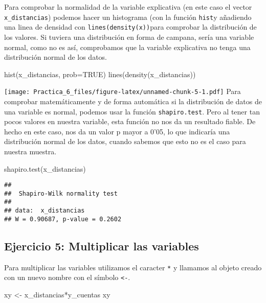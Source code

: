 \documentclass[
]{article}
\newenvironment{Shaded}{\begin{snugshade}}{\end{snugshade}}
\newcommand{\AttributeTok}[1]{\textcolor[rgb]{0.77,0.63,0.00}{#1}}
\newcommand{\ConstantTok}[1]{\textcolor[rgb]{0.00,0.00,0.00}{#1}}
\newcommand{\FunctionTok}[1]{\textcolor[rgb]{0.00,0.00,0.00}{#1}}
\newcommand{\NormalTok}[1]{#1}
\newcommand{\OtherTok}[1]{\textcolor[rgb]{0.56,0.35,0.01}{#1}}
\newcommand{\SpecialCharTok}[1]{\textcolor[rgb]{0.00,0.00,0.00}{#1}}
\begin{document}
Para comprobar la normalidad de la variable explicativa (en este caso el
vector \texttt{x\_distancias}) podemos hacer un histograma (con la
función \texttt{hist}y añadiendo una linea de densidad con
\texttt{lines(density(x))}para comprobar la distribución de los valores.
Si tuviera una distribución en forma de campana, sería una variable
normal, como no es así, comprobamos que la variable explicativa no tenga
una distribución normal de los datos.

\begin{Shaded}
\begin{Highlighting}[]
\FunctionTok{hist}\NormalTok{(x\_distancias, }\AttributeTok{prob=}\ConstantTok{TRUE}\NormalTok{)}
\FunctionTok{lines}\NormalTok{(}\FunctionTok{density}\NormalTok{(x\_distancias))}
\end{Highlighting}
\end{Shaded}

\texttt{[image: Practica\_6\_files/figure-latex/unnamed-chunk-5-1.pdf]}
Para comprobar matemáticamente y de forma automática si la distribución
de datos de una variable es normal, podemos usar la función
\texttt{shapiro.test}. Pero al tener tan pocos valores en nuestra
variable, esta función no nos da un resultado fiable. De hecho en este
caso, nos da un valor p mayor a 0'05, lo que indicaría una distribución
normal de los datos, cuando sabemos que esto no es el caso para nuestra
muestra.

\begin{Shaded}
\begin{Highlighting}[]
\FunctionTok{shapiro.test}\NormalTok{(x\_distancias)}
\end{Highlighting}
\end{Shaded}

\begin{verbatim}
## 
##  Shapiro-Wilk normality test
## 
## data:  x_distancias
## W = 0.90687, p-value = 0.2602
\end{verbatim}

\hypertarget{ejercicio-5-multiplicar-las-variables}{%
\subsection{Ejercicio 5: Multiplicar las
variables}\label{ejercicio-5-multiplicar-las-variables}}

Para multiplicar las variables utilizamos el caracter \texttt{*} y
llamamos al objeto creado con un nuevo nombre con el símbolo
\texttt{\textless{}-}.

\begin{Shaded}
\begin{Highlighting}[]
\NormalTok{xy }\OtherTok{\textless{}{-}}\NormalTok{ x\_distancias}\SpecialCharTok{*}\NormalTok{y\_cuentas}
\NormalTok{xy}
\end{Highlighting}
\end{Shaded}
\end{document}
